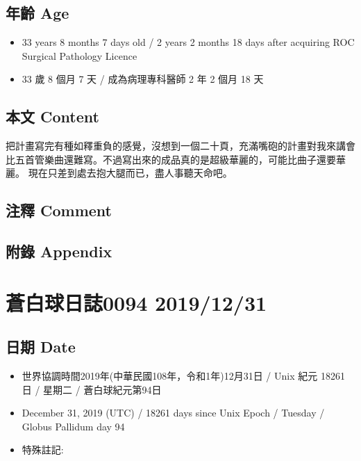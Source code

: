 \documentclass[
]{article}
\providecommand{\tightlist}{%
  \setlength{\itemsep}{0pt}\setlength{\parskip}{0pt}}
\begin{document}
\hypertarget{ux5e74ux9f61-age-29}{%
\subsection{年齡 Age}\label{ux5e74ux9f61-age-29}}

\begin{itemize}
\tightlist
\item
  33 years 8 months 7 days old / 2 years 2 months 18 days after
  acquiring ROC Surgical Pathology Licence
\item
  33 歲 8 個月 7 天 / 成為病理專科醫師 2 年 2 個月 18 天
\end{itemize}

\hypertarget{ux672cux6587-content-29}{%
\subsection{本文 Content}\label{ux672cux6587-content-29}}

把計畫寫完有種如釋重負的感覺，沒想到一個二十頁，充滿嘴砲的計畫對我來講會比五首管樂曲還難寫。不過寫出來的成品真的是超級華麗的，可能比曲子還要華麗。
現在只差到處去抱大腿而已，盡人事聽天命吧。

\hypertarget{ux6ce8ux91cb-comment-28}{%
\subsection{注釋 Comment}\label{ux6ce8ux91cb-comment-28}}

\hypertarget{ux9644ux9304-appendix-29}{%
\subsection{附錄 Appendix}\label{ux9644ux9304-appendix-29}}

\hypertarget{ux84bcux767dux7403ux65e5ux8a8c0094-20191231}{%
\section{蒼白球日誌0094
2019/12/31}\label{ux84bcux767dux7403ux65e5ux8a8c0094-20191231}}

\hypertarget{ux65e5ux671f-date-30}{%
\subsection{日期 Date}\label{ux65e5ux671f-date-30}}

\begin{itemize}
\tightlist
\item
  世界協調時間2019年(中華民國108年，令和1年)12月31日 / Unix 紀元 18261
  日 / 星期二 / 蒼白球紀元第94日
\item
  December 31, 2019 (UTC) / 18261 days since Unix Epoch / Tuesday /
  Globus Pallidum day 94
\item
  特殊註記:
\end{itemize}
\end{document}
